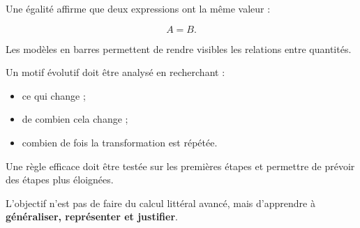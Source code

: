 Une égalité affirme que deux expressions ont la même valeur :

\[
\boxed{A=B}.
\]

Les modèles en barres permettent de rendre visibles les relations entre quantités.

Un motif évolutif doit être analysé en recherchant :

\begin{itemize}
\item ce qui change ;
\item de combien cela change ;
\item combien de fois la transformation est répétée.
\end{itemize}

Une règle efficace doit être testée sur les premières étapes et permettre de prévoir des étapes plus éloignées.

L’objectif n’est pas de faire du calcul littéral avancé, mais d’apprendre à \textbf{généraliser, représenter et justifier}.
